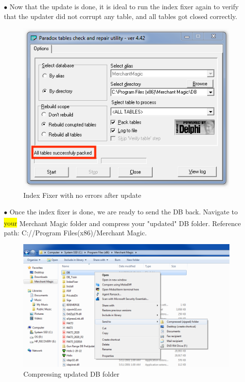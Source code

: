 \documentclass[a4paper, 11pt]{article}
\begin{document}
\pagebreak

\vspace*{\fill}
$\bullet$ Now that the update is done, it is ideal to run the index fixer again to verify that the updater did not corrupt any table, and all tables got closed correctly.
\begin{figure}[h]
    \centering
     \includegraphics[width=\textwidth]{capture 40}
    \caption{Index Fixer with no errors after update}
\end{figure}
\vspace*{\fill}

\pagebreak

\vspace*{\fill}
$\bullet$ Once the index fixer is done, we are ready to send the DB back. Navigate to \colorbox{yellow}{your} Merchant Magic\textsuperscript{\textregistered} folder and compress your "updated" DB folder. Reference path: C://Program Files(x86)/Merchant Magic.
\begin{figure}[h]
    \centering
     \includegraphics[width=\textwidth]{capture 41}
    \caption{Compressing updated DB folder}
\end{figure}
\vspace*{\fill}
\end{document}
